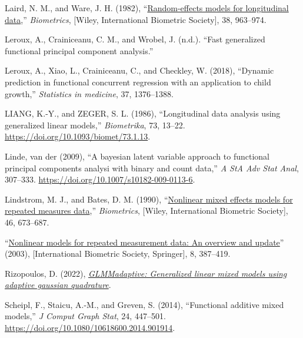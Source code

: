 \documentclass[
  11pt,
]{article}
\newlength{\cslhangindent}
\newlength{\cslentryspacingunit} %
\newenvironment{CSLReferences}[2] %
 {%
  \setlength{\parindent}{0pt}
  \ifodd #1
  \let\oldpar\par
  \def\par{\hangindent=\cslhangindent\oldpar}
  \fi
  \setlength{\parskip}{#2\cslentryspacingunit}
 }%
 {}
\begin{document}
\begin{CSLReferences}{1}{0}
\leavevmode{}%
Laird, N. M., and Ware, J. H. (1982),
{``\href{http://www.jstor.org/stable/2529876}{Random-effects models for
longitudinal data},''} \emph{Biometrics}, {[}Wiley, International
Biometric Society{]}, 38, 963--974.

\leavevmode{}%
Leroux, A., Crainiceanu, C. M., and Wrobel, J. (n.d.). {``Fast
generalized functional principal component analysis.''}

\leavevmode{}%
Leroux, A., Xiao, L., Crainiceanu, C., and Checkley, W. (2018),
{``Dynamic prediction in functional concurrent regression with an
application to child growth,''} \emph{Statistics in medicine}, 37,
1376--1388.

\leavevmode{}%
LIANG, K.-Y., and ZEGER, S. L. (1986), {``Longitudinal data analysis
using generalized linear models,''} \emph{Biometrika}, 73, 13--22.
\url{https://doi.org/10.1093/biomet/73.1.13}.

\leavevmode{}%
Linde, van der (2009), {``A bayesian latent variable approach to
functional principal components analysi with binary and count data,''}
\emph{A StA Adv Stat Anal}, 307--333.
\url{https://doi.org/10.1007/s10182-009-0113-6}.

\leavevmode{}%
Lindstrom, M. J., and Bates, D. M. (1990),
{``\href{http://www.jstor.org/stable/2532087}{Nonlinear mixed effects
models for repeated measures data},''} \emph{Biometrics}, {[}Wiley,
International Biometric Society{]}, 46, 673--687.

\leavevmode{}%
{``\href{http://www.jstor.org/stable/1400665}{Nonlinear models for
repeated measurement data: An overview and update}''} (2003),
{[}International Biometric Society, Springer{]}, 8, 387--419.

\leavevmode{}%
Rizopoulos, D. (2022),
\emph{\href{https://CRAN.R-project.org/package=GLMMadaptive}{GLMMadaptive:
Generalized linear mixed models using adaptive gaussian quadrature}}.

\leavevmode{}%
Scheipl, F., Staicu, A.-M., and Greven, S. (2014), {``Functional
additive mixed models,''} \emph{J Comput Graph Stat}, 24, 447--501.
\url{https://doi.org/10.1080/10618600.2014.901914}.


\end{CSLReferences}
\end{document}
